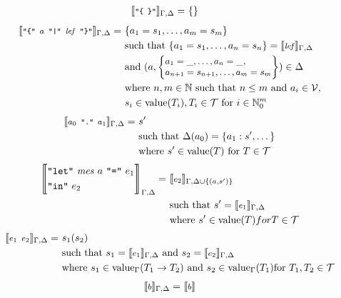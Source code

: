 \documentclass[]{scrbook}
\newcommand{\mf}[1]{\text{\texttt{#1}}}
\newcommand{\semantic}[1]{\llbracket \text{\footnotesize\texttt{#1}} \rrbracket}
\theoremstyle{definition}
\theoremstyle{definition}
\theoremstyle{definition}
\theoremstyle{remark}
\begin{document}
\[\begin{aligned}
\semantic{"\{ \}"}_{\Gamma,\Delta} =\ & \{ \}
 \end{aligned}
\] \[
\begin{aligned}
\semantic{"\{" $a$ "|" $\mathit{lef}$ "\}"}_{\Gamma,\Delta} =\ & \{a_1=s_1,\dots,a_m=s_m\}\\
    & \text{such that }\{a_1 = s_1,\dots,a_n = s_n\}=\semantic{$\mathit{lef}$}_{\Gamma,\Delta}\\
    & \text{and } (a,\small\begin{Bmatrix*}[l]a_1=\_,\dots,a_n=\_,\\a_{n+1}=s_{n+1},\dots,a_m=s_m\end{Bmatrix*})\in\Delta\\
    &\text{where } n,m\in\mathbb{N} \text{ such that } n \leq m \text{ and } a_i\in\mathcal{V},\\
    &s_i\in\text{value}(T_i),T_i\in\mathcal{T} \text{ for }i\in\mathbb{N}_0^m
\end{aligned}
\] \[
\begin{aligned}
\semantic{$a_0$ "." $a_1$}_{\Gamma,\Delta} =\ & s'\\
    & \text{such that }\Delta(a_0) = \{a_1:s',\dots\}\\
    & \text{where } s'\in\text{value}(T) \text{ for } T\in\mathcal{T}
\end{aligned}
\] \[
\begin{aligned}
\Bigg\llbracket\begin{aligned}
 &\mf{"let"} \ \mathit{mes} \ a \ \mf{"="} \ e_1 \\
 &\mf{"in"} \ e_2
 \end{aligned}\Bigg\rrbracket_{\Gamma,\Delta} =\ & \semantic{$e_2$}_{\Gamma,\Delta\cup\{(a,s')\}}\\
    & \text{such that } s' = \semantic{$e_1$}_{\Gamma,\Delta}\\
    & \text{where } s' \in\text{value}(T) for T\in\mathcal{T}
\end{aligned}
\] \[
\begin{aligned}
\semantic{$e_1 \ e_2$}_{\Gamma,\Delta} =\ & s_1(s_2)\\
    & \text{such that } s_1 = \semantic{$e_1$}_{\Gamma,\Delta}\text{ and } s_2 = \semantic{$e_2$}_{\Gamma,\Delta}\\
    & \text{where } s_1 \in\text{value}_\Gamma(T_1\to T_2) \text{ and } s_2\in\text{value}_\Gamma(T_1) \text{for }T_1,T_2\in\mathcal{T} 
 \end{aligned}
\] \[
\begin{aligned}
 \semantic{$b$}_{\Gamma,\Delta} =\ & \semantic{$b$}\\

\end{aligned}\]
\end{document}
